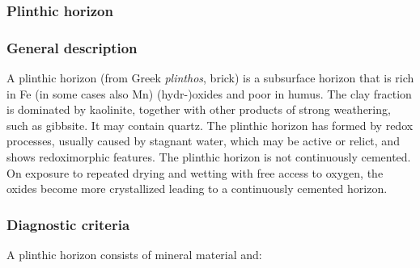 \documentclass[
  letterpaper,
  DIV=11,
  numbers=noendperiod]{scrreprt}
\begin{document}
\hypertarget{plinthic-horizon}{%
\subsubsection{Plinthic horizon}\label{plinthic-horizon}}

\hypertarget{general-description-29}{%
\subsubsection{General description}\label{general-description-29}}

A plinthic horizon (from Greek \emph{plinthos}, brick) is a subsurface
horizon that is rich in Fe (in some cases also Mn) (hydr-)oxides and
poor in humus. The clay fraction is dominated by kaolinite, together
with other products of strong weathering, such as gibbsite. It may
contain quartz. The plinthic horizon has formed by redox processes,
usually caused by stagnant water, which may be active or relict, and
shows redoximorphic features. The plinthic horizon is not continuously
cemented. On exposure to repeated drying and wetting with free access to
oxygen, the oxides become more crystallized leading to a continuously
cemented horizon.

\hypertarget{diagnostic-criteria-29}{%
\subsubsection{Diagnostic criteria}\label{diagnostic-criteria-29}}

A plinthic horizon consists of mineral material and:
\end{document}
